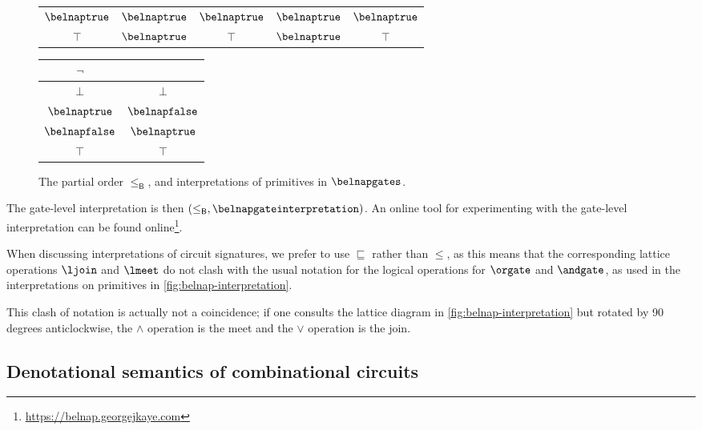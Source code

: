 \documentclass{lmcs}
\begin{document}
\begin{exa}
\begin{figure*}
\begin{tabular}{|c|cccc|}
            \(\belnaptrue\)  & \(\belnaptrue\) & \(\belnaptrue\)  & \(\belnaptrue\) & \(\belnaptrue\) \\
            \(\top\)         & \(\belnaptrue\) & \(\top\)         & \(\belnaptrue\) & \(\top\)        \\
            \hline
        \end{tabular}
        \quad
        \begin{tabular}{|c|c|}
            \hline
            \(\neg\)         &                  \\
            \hline
            \(\bot\)         & \(\bot\)         \\
            \(\belnaptrue\)  & \(\belnapfalse\) \\
            \(\belnapfalse\) & \(\belnaptrue\)  \\
            \(\top\)         & \(\top\)         \\
            \hline
        \end{tabular}
        \caption{
            The partial order \(\leq_\mathsf{B}\), and interpretations
            of primitives in \(\belnapgates\).
        }
        \label{fig:belnap-interpretation}
    \end{figure*}

    The gate-level interpretation is then \(
    (\leq_\mathsf{B}, \belnapgateinterpretation)
    \).
    An online tool for experimenting with the gate-level interpretation can be found
    online\footnote{\url{https://belnap.georgejkaye.com}}.
\end{exa}

\begin{rem}
    When discussing interpretations of circuit signatures, we prefer to use
    \(\sqsubseteq\) rather than \(\leq\), as this means that the corresponding
    lattice operations \(\ljoin\) and \(\lmeet\) do not clash with the usual
    notation for the logical operations for \(\orgate\) and \(\andgate\), as
    used in the interpretations on primitives in
    \autoref{fig:belnap-interpretation}.

    This clash of notation is actually not a coincidence; if one consults the
    lattice diagram in \autoref{fig:belnap-interpretation} but rotated by 90
    degrees anticlockwise, the \(\land\) operation is the meet and the
    \(\lor\) operation is the join.
\end{rem}

\subsection{Denotational semantics of combinational circuits}
\end{document}
